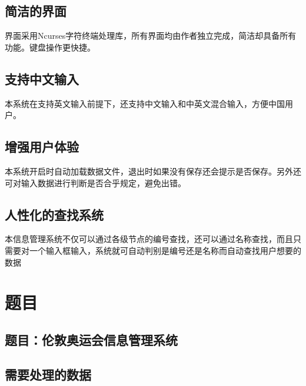 \documentclass[10pt,a4paper]{article}
\begin{document}
\subsection{简洁的界面}
界面采用Ncurses字符终端处理库，所有界面均由作者独立完成，简洁却具备所有功能。键盘操作更快捷。
\subsection{支持中文输入}
本系统在支持英文输入前提下，还支持中文输入和中英文混合输入，方便中国用户。
\subsection{增强用户体验}
本系统开启时自动加载数据文件，退出时如果没有保存还会提示是否保存。另外还可对输入数据进行判断是否合乎规定，避免出错。
\subsection{人性化的查找系统}
本信息管理系统不仅可以通过各级节点的编号查找，还可以通过名称查找，而且只需要对一个输入框输入，系统就可自动判别是编号还是名称而自动查找用户想要的数据
\newpage
\section{题目}
\subsection{题目：伦敦奥运会信息管理系统}
\subsection{需要处理的数据}
\end{document}
